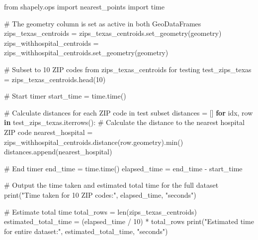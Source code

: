 \documentclass[
  letterpaper,
  DIV=11,
  numbers=noendperiod]{scrartcl}
\newenvironment{Shaded}{\begin{snugshade}}{\end{snugshade}}
\newcommand{\BuiltInTok}[1]{\textcolor[rgb]{0.00,0.23,0.31}{#1}}
\newcommand{\CommentTok}[1]{\textcolor[rgb]{0.37,0.37,0.37}{#1}}
\newcommand{\ControlFlowTok}[1]{\textcolor[rgb]{0.00,0.23,0.31}{\textbf{#1}}}
\newcommand{\DecValTok}[1]{\textcolor[rgb]{0.68,0.00,0.00}{#1}}
\newcommand{\ImportTok}[1]{\textcolor[rgb]{0.00,0.46,0.62}{#1}}
\newcommand{\KeywordTok}[1]{\textcolor[rgb]{0.00,0.23,0.31}{\textbf{#1}}}
\newcommand{\NormalTok}[1]{\textcolor[rgb]{0.00,0.23,0.31}{#1}}
\newcommand{\OperatorTok}[1]{\textcolor[rgb]{0.37,0.37,0.37}{#1}}
\newcommand{\StringTok}[1]{\textcolor[rgb]{0.13,0.47,0.30}{#1}}
\begin{document}
\begin{Shaded}
\begin{Highlighting}[]
\ImportTok{from}\NormalTok{ shapely.ops }\ImportTok{import}\NormalTok{ nearest\_points}
\ImportTok{import}\NormalTok{ time}

\CommentTok{\# The geometry column is set as active in both GeoDataFrames}
\NormalTok{zips\_texas\_centroids }\OperatorTok{=}\NormalTok{ zips\_texas\_centroids.set\_geometry(}\StringTok{\textquotesingle{}geometry\textquotesingle{}}\NormalTok{)}
\NormalTok{zips\_withhospital\_centroids }\OperatorTok{=}\NormalTok{ zips\_withhospital\_centroids.set\_geometry(}\StringTok{\textquotesingle{}geometry\textquotesingle{}}\NormalTok{)}

\CommentTok{\# Subset to 10 ZIP codes from zips\_texas\_centroids for testing}
\NormalTok{test\_zips\_texas }\OperatorTok{=}\NormalTok{ zips\_texas\_centroids.head(}\DecValTok{10}\NormalTok{)}

\CommentTok{\# Start timer}
\NormalTok{start\_time }\OperatorTok{=}\NormalTok{ time.time()}

\CommentTok{\# Calculate distances for each ZIP code in test subset}
\NormalTok{distances }\OperatorTok{=}\NormalTok{ []}
\ControlFlowTok{for}\NormalTok{ idx, row }\KeywordTok{in}\NormalTok{ test\_zips\_texas.iterrows():}
    \CommentTok{\# Calculate the distance to the nearest hospital ZIP code}
\NormalTok{    nearest\_hospital }\OperatorTok{=}\NormalTok{ zips\_withhospital\_centroids.distance(row.geometry).}\BuiltInTok{min}\NormalTok{()}
\NormalTok{    distances.append(nearest\_hospital)}

\CommentTok{\# End timer}
\NormalTok{end\_time }\OperatorTok{=}\NormalTok{ time.time()}
\NormalTok{elapsed\_time }\OperatorTok{=}\NormalTok{ end\_time }\OperatorTok{{-}}\NormalTok{ start\_time}

\CommentTok{\# Output the time taken and estimated total time for the full dataset}
\BuiltInTok{print}\NormalTok{(}\StringTok{"Time taken for 10 ZIP codes:"}\NormalTok{, elapsed\_time, }\StringTok{"seconds"}\NormalTok{)}

\CommentTok{\# Estimate total time }
\NormalTok{total\_rows }\OperatorTok{=} \BuiltInTok{len}\NormalTok{(zips\_texas\_centroids)}
\NormalTok{estimated\_total\_time }\OperatorTok{=}\NormalTok{ (elapsed\_time }\OperatorTok{/} \DecValTok{10}\NormalTok{) }\OperatorTok{*}\NormalTok{ total\_rows}
\BuiltInTok{print}\NormalTok{(}\StringTok{"Estimated time for entire dataset:"}\NormalTok{, estimated\_total\_time, }\StringTok{"seconds"}\NormalTok{)}
\end{Highlighting}
\end{Shaded}
\end{document}
